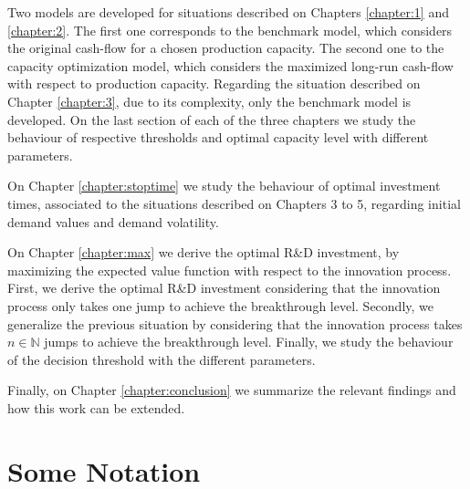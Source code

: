 Two models are developed for situations described on Chapters \ref{chapter:1} and \ref{chapter:2}. The first one corresponds to the benchmark model, which considers the original cash-flow for a chosen production capacity. The second one to the capacity optimization model, which considers the maximized long-run cash-flow with respect to production capacity. 
Regarding the situation described on Chapter \ref{chapter:3}, due to its complexity, only the benchmark model is developed.
On the last section of each of the three chapters we study the behaviour of respective thresholds and optimal capacity level with different parameters.


On Chapter \ref{chapter:stoptime} we study the behaviour of optimal investment times, associated to the situations described on Chapters 3 to 5, regarding initial demand values and demand volatility.



On Chapter \ref{chapter:max} we derive the optimal R\&D investment, by maximizing the expected value function with respect to the innovation process. 
First, we derive the optimal R\&D investment considering that the innovation process only takes one jump to achieve the breakthrough level.
Secondly, we generalize the previous situation by considering that the innovation process takes $n \in \mathds{N}$ jumps to achieve the breakthrough level.
Finally, we study the behaviour of the decision threshold with the different parameters.



Finally, on Chapter \ref{chapter:conclusion} we summarize the relevant findings and how this work can be extended.




\section{Some Notation}
\label{intro:notation}

